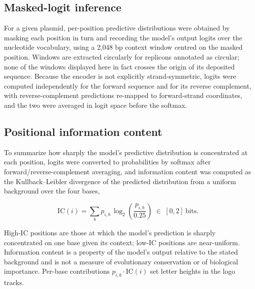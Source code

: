 %

\subsection*{Masked-logit inference}

For a given plasmid, per-position predictive distributions were obtained by
masking each position in turn and recording the model's output logits over
the nucleotide vocabulary, using a 2,048 bp context window centred on the
masked position. Windows are extracted circularly for replicons annotated as
circular; none of the windows displayed here in fact crosses the origin of
its deposited sequence. Because the encoder is not explicitly strand-symmetric,
logits were computed independently for the forward sequence and for its
reverse complement, with reverse-complement predictions re-mapped to
forward-strand coordinates, and the two were averaged in logit space before
the softmax.

\subsection*{Positional information content}

To summarize how sharply the model's predictive distribution is concentrated
at each position, logits were converted to probabilities by softmax after
forward/reverse-complement averaging, and information content was computed as
the Kullback--Leibler divergence of the predicted distribution from a uniform
background over the four bases,

\[
\mathrm{IC}(i) = \sum_b p_{i,b}\,\log_2\!\left(\frac{p_{i,b}}{0.25}\right)
\;\in\; [0,2]\ \text{bits}.
\]

High-IC positions are those at which the model's prediction is sharply
concentrated on one base given its context; low-IC positions are
near-uniform. Information content is a property of the model's output
relative to the stated background and is not a measure of evolutionary
conservation or of biological importance. Per-base contributions
$p_{i,b}\cdot\mathrm{IC}(i)$ set letter heights in the logo tracks.

